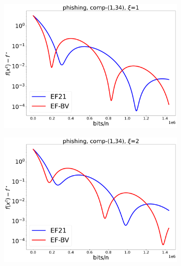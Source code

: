 \documentclass{article} %
\theoremstyle{plain}
\theoremstyle{definition}
\theoremstyle{remark}
\begin{document}
\begin{figure}[!htbp]
\begin{subfigure}[b]{0.32\textwidth}
         \includegraphics[width=\textwidth]{img/phishing/CompK_34_1_phishing_8124workers_3000K_11055_phishing_34_1_1_1_logreg_diff_conv.pdf}
         \label{007}
      \end{subfigure}
      \hfill
      \begin{subfigure}[b]{0.32\textwidth}
         \centering
         \includegraphics[width=\textwidth]{img/phishing/CompK_34_1_phishing_8124workers_3000K_11055_phishing_34_1_1_2_logreg_diff_conv.pdf}
         \label{008}
      \end{subfigure}
      \hfill
      \begin{subfigure}[b]{0.32\textwidth}
         \centering

\end{subfigure}
\end{figure}
\end{document}
